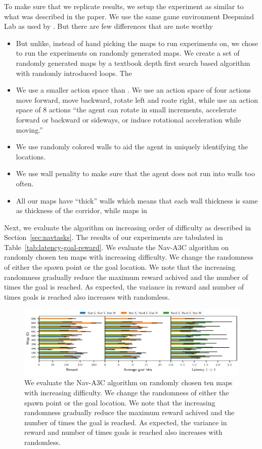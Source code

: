 To make sure that we replicate \cite{MiPaViICLR2017} results, we setup the experiment as similar to what was described in the paper. We use the same game environment Deepmind Lab \cite{BeLeTeARXIV2016} as used by \cite{MiPaViICLR2017}. But there are few differences that are note worthy
\begin{itemize}
\item But unlike, \cite{MiPaViICLR2017} instead of hand picking the maps to run experiments on, we chose to run the experiments on randomly generated maps.
We create a set of randomly generated maps by a textbook depth first search based algorithm with randomly introduced loops. The 
\item We use a smaller action space than \cite{MiPaViICLR2017}. We use an action space of four actions move forward, move backward, rotate left and roate right, while \cite{MiPaViICLR2017} use an action space of 8 actions ``the agent can rotate in small increments, accelerate forward or backward or
sideways, or induce rotational acceleration while moving.''
\item We use randomly colored walls to aid the agent in uniquely identifying the locations.
\item We use wall penality to make sure that the agent does not run into walls too often.
\item All our maps have ``thick'' walls which means that each wall thickness is same as thickness of the corridor, while maps in \cite{MiPaViICLR2017}
\end{itemize}

Next, we evaluate the algorithm on increasing order of difficulty as described in Section~\ref{sec:navtasks}. The results of our experiments are tabulated in Table~\ref{tab:latency-goal-reward}.
We evaluate the Nav-A3C\cite{MiPaViICLR2017} algorithm on randomly chosen ten maps with increasing difficulty.
We change the randomness of either the spawn point or the goal location.
We note that the increasing randomness gradually reduce the maximum reward achived and the number of times the goal is reached. As expected, the variance in reward and number of times goals is reached also increases with randomless.

\begin{figure}%
  \includegraphics[width=\linewidth]{images/plot_summary_bar_plots.pdf}%
\caption{We evaluate the Nav-A3C\cite{MiPaViICLR2017} algorithm on randomly chosen ten maps with increasing difficulty. We change the randomness of either the spawn point or the goal location. We note that the increasing randomness gradually reduce the maximum reward achived and the number of times the goal is reached. As expected, the variance in reward and number of times goals is reached also increases with randomless.}
\label{fig:latency-goal_reward}
\end{figure}

